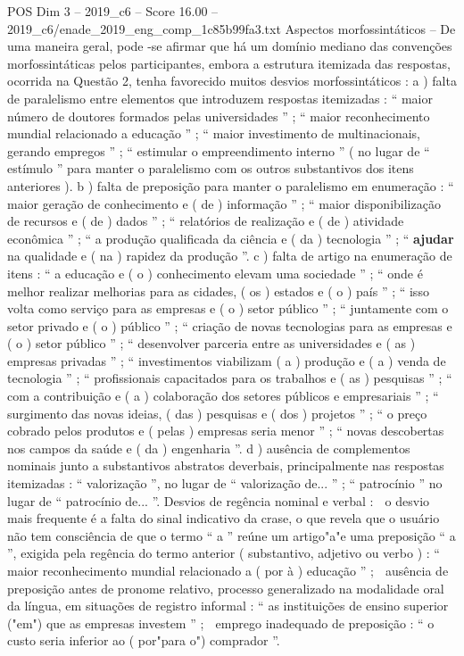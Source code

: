 \begin{textsample}{POS Dim 3 – 2019\_c6 – Score 16.00 – 2019\_c6/enade\_2019\_eng\_comp\_1c85b99fa3.txt}
Aspectos morfossintáticos – De uma maneira geral, pode -se afirmar que há um domínio mediano das convenções morfossintáticas pelos participantes, embora a estrutura itemizada das respostas, ocorrida na Questão 2, tenha favorecido muitos desvios morfossintáticos : a ) falta de paralelismo entre elementos que introduzem respostas itemizadas : “ maior número de doutores formados pelas universidades ” ; “ maior reconhecimento mundial relacionado a educação ” ; “ maior investimento de multinacionais, gerando empregos ” ; “ estimular o empreendimento interno ” ( no lugar de “ estímulo ” para manter o paralelismo com os outros substantivos dos itens anteriores ). b ) falta de preposição para manter o paralelismo em enumeração : “ maior geração de conhecimento e ( de ) informação ” ; “ maior disponibilização de recursos e ( de ) dados ” ; “ relatórios de realização e ( de ) atividade econômica ” ; “ a produção qualificada da ciência e ( da ) tecnologia ” ; “ \textbf{ajudar} na qualidade e ( na ) rapidez da produção ”. c ) falta de artigo na enumeração de itens : “ a educação e ( o ) conhecimento elevam uma sociedade ” ; “ onde é melhor realizar melhorias para as cidades, ( os ) estados e ( o ) país ” ; “ isso volta como serviço para as empresas e ( o ) setor público ” ; “ juntamente com o setor privado e ( o ) público ” ; “ criação de novas tecnologias para as empresas e ( o ) setor público ” ; “ desenvolver parceria entre as universidades e ( as ) empresas privadas ” ; “ investimentos viabilizam ( a ) produção e ( a ) venda de tecnologia ” ; “ profissionais capacitados para os trabalhos e ( as ) pesquisas ” ; “ com a contribuição e ( a ) colaboração dos setores públicos e empresariais ” ; “ surgimento das novas ideias, ( das ) pesquisas e ( dos ) projetos ” ; “ o preço cobrado pelos produtos e ( pelas ) empresas seria menor ” ; “ novas descobertas nos campos da saúde e ( da ) engenharia ”. d ) ausência de complementos nominais junto a substantivos abstratos deverbais, principalmente nas respostas itemizadas : “ valorização ”, no lugar de “ valorização de... ” ; “ patrocínio ” no lugar de “ patrocínio de... ”.
Desvios de regência nominal e verbal :  o desvio mais frequente é a falta do sinal indicativo da crase, o que revela que o usuário não tem consciência de que o termo “ a ” reúne um artigo"a"e uma preposição “ a ”, exigida pela regência do termo anterior ( substantivo, adjetivo ou verbo ) : “ maior reconhecimento mundial relacionado a ( por à ) educação ” ;  ausência de preposição antes de pronome relativo, processo generalizado na modalidade oral da língua, em situações de registro informal : “ as instituições de ensino superior ("em") que as empresas investem ” ;  emprego inadequado de preposição : “ o custo seria inferior ao ( por"para o") comprador ”.

\end{textsample}
